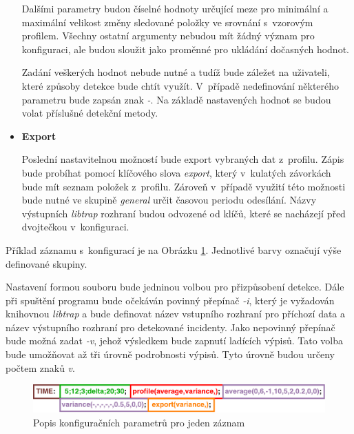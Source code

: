\begin{itemize}
  Dalšími parametry budou číselné hodnoty určující meze pro minimální a maximální velikost 
  změny sledované položky ve srovnání s~vzorovým profilem. Všechny ostatní argumenty nebudou mít
  žádný význam pro konfiguraci, ale 
  budou sloužit jako proměnné pro ukládání dočasných hodnot.
  
  Zadání veškerých hodnot nebude nutné a tudíž bude záležet na uživateli, které způsoby detekce 
  bude chtít využít. V~případě nedefinování některého parametru bude zapsán znak \textit{-}.
  Na základě nastavených hodnot se budou volat příslušné detekční metody.
  
  \item \textbf{Export}
  
  Poslední nastavitelnou možností bude export vybraných dat z~profilu. Zápis bude probíhat pomocí 
  klíčového slova \textit{export}, který v~kulatých závorkách bude mít seznam položek z~profilu. Zároveň 
  v~případě využití této možnosti bude nutné ve skupině \textit{general} určit časovou periodu
  odesílání.
  Názvy výstupních \textit{libtrap} rozhraní
  budou odvozené od klíčů, které se nacházejí před dvojtečkou v~konfiguraci.
  
 \end{itemize}

 Příklad záznamu s~konfigurací je na Obrázku \ref{obr.config}. Jednotlivé barvy označují 
 výše definované skupiny. 
 
 Nastavení formou
 souboru bude jedninou volbou pro přizpůsobení detekce. Dále při 
 spuštění programu bude očekáván povinný přepínač \textit{-i}, který je vyžadován knihovnou 
 \textit{libtrap} a bude definovat název vstupního
 rozhraní pro příchozí data a název výstupního rozhraní pro detekované incidenty. Jako nepovinný přepínač
 bude možná zadat \textit{-v}, jehož výsledkem bude zapnutí ladících výpisů. Tato volba bude umožňovat 
 až tři úrovně podrobnosti výpisů. Tyto úrovně budou určeny počtem znaků \textit{v}.
 
   \begin{figure}[ht]
   \begin{center}
   \includegraphics[scale=0.5]{pictures/config-file-frame}
   \caption{Popis konfiguračních parametrů pro jeden záznam}
   \label{obr.config}
   \end{center}
   \end{figure}
 
